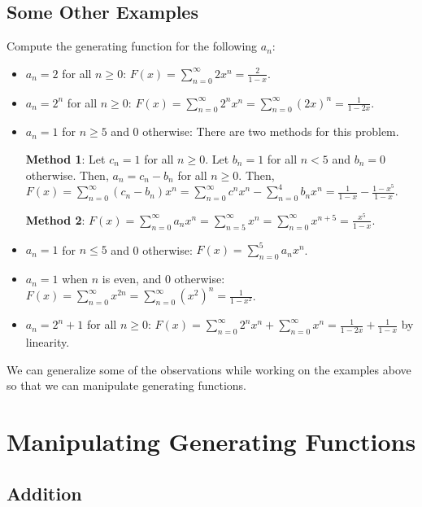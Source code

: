 \subsection{Some Other Examples}

\begin{example}
    Compute the generating function for the following $a_n$:
    \begin{itemize}
        \item $a_n = 2$ for all $n \geq 0$: $F(x) = \sum_{n=0}^\infty 2 x^n = \frac{2}{1-x}$.
        \item $a_n = 2^n$ for all $n \geq 0$: $F(x) = \sum_{n=0}^\infty 2^n x^n = \sum_{n=0}^\infty (2x)^n = \frac{1}{1-2x}$. 
        \item $a_n = 1$ for $n \geq 5$ and 0 otherwise: There are two methods for this problem.
        
        \textbf{Method 1}: Let $c_n = 1$ for all $n \geq 0$. Let $b_n = 1$ for all $n < 5$ and $b_n = 0$ otherwise. Then, $a_n = c_n - b_n$ for all $n \geq 0$. Then, $F(x) = \sum_{n=0}^\infty (c_n - b_n) x^n = \sum_{n=0}^\infty c^n x^n - \sum_{n=0}^4 b_n x^n = \frac{1}{1-x} - \frac{1-x^5}{1-x}$.

        \textbf{Method 2}: $F(x) = \sum_{n=0}^\infty a_n x^n = \sum_{n=5}^\infty x^n = \sum_{n=0}^\infty x^{n+5} = \frac{x^5}{1-x}$.
        \item $a_n = 1$ for $n \leq 5$ and 0 otherwise: $F(x) = \sum_{n=0}^5 a_n x^n$.
        \item $a_n = 1$ when $n$ is even, and 0 otherwise: $F(x) = \sum_{n=0}^\infty x^{2n} = \sum_{n=0}^\infty (x^2)^n = \frac{1}{1-x^2}$.
        \item $a_n = 2^n + 1$ for all $n \geq 0$: $F(x) = \sum_{n=0}^\infty 2^n x^n + \sum_{n=0}^\infty x^n = \frac{1}{1-2x} + \frac{1}{1-x}$ by linearity.
    \end{itemize}
\end{example}

We can generalize some of the observations while working on the examples above so that we can manipulate generating functions.

\section{Manipulating Generating Functions}

\subsection{Addition}


